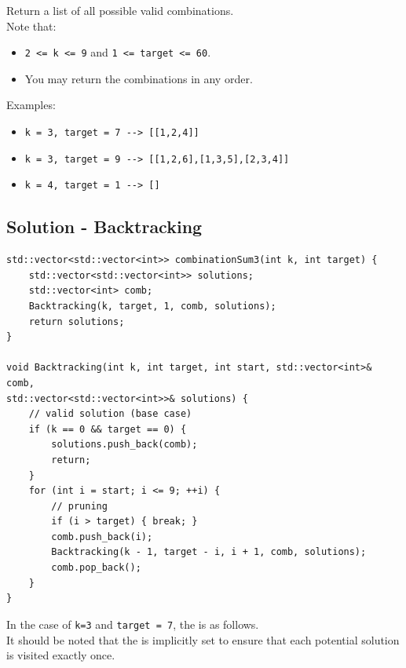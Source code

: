 Return a list of all possible valid combinations.\\

Note that:
\begin{itemize}
	\item {\colorbox{CodeBackground}{\lstinline|2 <= k <= 9|}} and {\colorbox{CodeBackground}{\lstinline|1 <= target <= 60|}}.
	\item You may return the combinations in any order.
\end{itemize}

Examples:
\begin{itemize}
	\item {\colorbox{CodeBackground}{\lstinline|k = 3, target = 7 --> [[1,2,4]]|}}
	\item {\colorbox{CodeBackground}{\lstinline|k = 3, target = 9 --> [[1,2,6],[1,3,5],[2,3,4]]|}}
	\item {\colorbox{CodeBackground}{\lstinline|k = 4, target = 1 --> []|}}
\end{itemize}

\subsection*{Solution - Backtracking}
\begin{lstlisting}
std::vector<std::vector<int>> combinationSum3(int k, int target) {
	std::vector<std::vector<int>> solutions;
	std::vector<int> comb;
	Backtracking(k, target, 1, comb, solutions);
	return solutions;
}

void Backtracking(int k, int target, int start, std::vector<int>& comb,
std::vector<std::vector<int>>& solutions) {
	// valid solution (base case)
	if (k == 0 && target == 0) {
		solutions.push_back(comb);
		return;
	}
	for (int i = start; i <= 9; ++i) {
		// pruning
		if (i > target) { break; }
		comb.push_back(i);
		Backtracking(k - 1, target - i, i + 1, comb, solutions);
		comb.pop_back();
	}
}
\end{lstlisting}\mbox{}

In the case of {\colorbox{CodeBackground}{\lstinline|k=3|}} and {\colorbox{CodeBackground}{\lstinline|target = 7|}}, the {\color{blue}{potential search tree}} is as follows. \\

It should be noted that the {\color{blue}{search order}} is implicitly set to ensure that each potential solution is visited exactly once.


